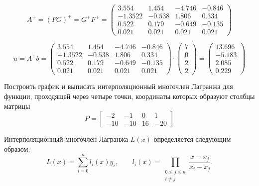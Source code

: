 \begin{equation*}
    A^+ = (FG)^+ = G^+ F^+ =
    \begin{pmatrix}
        3.554  & 1.454 & -4.746 & -0.846\\
        -1.3522 & -0.538 &  1.806 &  0.334\\
        0.522  & 0.179 & -0.649 & -0.135\\
        0.021  & 0.021 &  0.021 &  0.021
    \end{pmatrix}
\end{equation*}

\begin{equation*}
    u = A^+ b =
    \begin{pmatrix}
        3.554  & 1.454 & -4.746 & -0.846\\
        -1.3522 & -0.538 &  1.806 &  0.334\\
        0.522  & 0.179 & -0.649 & -0.135\\
        0.021  & 0.021 &  0.021 &  0.021
    \end{pmatrix}
    \cdot
    \begin{pmatrix}
        7\\
        0\\
        2\\
        2
    \end{pmatrix}
    =
    \begin{pmatrix}
        13.696\\
        -5.183\\
        2.085\\
        0.229
    \end{pmatrix}
\end{equation*}

\newpage
\begin{problem}
    Построить график и выписать интерполяционный многочлен Лагранжа для
    функции, проходящей через четыре точки, координаты которых образуют
    столбцы матрицы
    \begin{equation*}
        P =
        \begin{bmatrix}
            -2 & -1 & 0 & 1\\
            -10 & -10 & 16 & -20
        \end{bmatrix}
    \end{equation*}
\end{problem}

Интерполяционный многочлен Лагранжа $L(x)$ определяется следующим образом:
\begin{equation*}
    L(x) = \sum_{i=0}^{n}{l_i(x) y_i}, \qquad
    l_i(x) = \prod_{
        \substack{0 \leq j \leq n\\i \neq j}
    }{
        \frac{x - x_j}{x_i - x_j}
    }.
\end{equation*}

